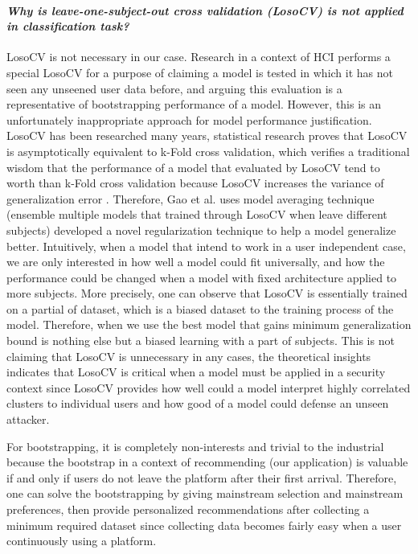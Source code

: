 \paragraph{\emph{Why is leave-one-subject-out cross validation (LosoCV) is not applied in classification task?}}

LosoCV is not necessary in our case. Research in a context of HCI performs a special LosoCV
for a purpose of claiming a model is tested in which it has not seen any unseened user data before,
and arguing this evaluation is a representative of bootstrapping performance of a model.
However, this is an unfortunately inappropriate approach for model performance justification.
LosoCV has been researched many years, statistical research \cite{xu2012asymptotic} proves 
that LosoCV is asymptotically equivalent to k-Fold cross validation, which verifies 
a traditional wisdom that the performance of 
a model that evaluated by LosoCV tend to worth than k-Fold cross validation because
LosoCV increases the variance of generalization error \cite{bengio2004no}. Therefore, Gao et al. uses 
model averaging technique (ensemble multiple models that trained through LosoCV when 
leave different subjects) developed a novel regularization technique \cite{gao2016139} 
to help a model generalize better.
Intuitively, when a model that intend to work in a user independent case, 
we are only interested in how well a model could fit universally, 
and how the performance could be changed when a model with fixed architecture applied to more subjects.
More precisely, one can observe that LosoCV is essentially trained on a partial of dataset, 
which is a biased dataset to the training process of the model. Therefore, when we use 
the best model that gains minimum generalization bound is nothing else but a biased learning 
with a part of subjects.
This is not claiming that LosoCV is unnecessary in any cases, the theoretical insights indicates
that LosoCV is critical when a model must be applied in a security context since 
LosoCV provides how well could a model interpret highly correlated clusters 
to individual users and how good of a model could defense an unseen attacker.

For bootstrapping, it is completely non-interests and trivial to the industrial 
because the bootstrap in a context of recommending (our application) is valuable if and only if
users do not leave the platform after their first arrival. Therefore, one can solve
the bootstrapping by giving mainstream selection and mainstream preferences, then provide
personalized recommendations after collecting a minimum required dataset since 
collecting data becomes fairly easy when a user continuously using a platform.

